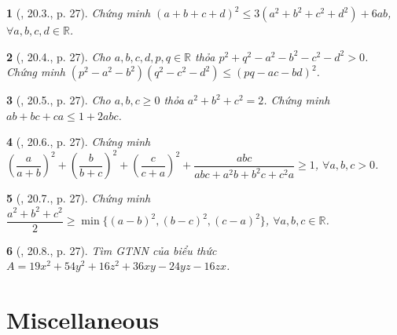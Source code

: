 \documentclass{article}
\newtheorem{baitoan}{}
\begin{document}
\begin{baitoan}[\cite{Hai_Hung_Thu_Tung_ncpt_Toan_10_tap_2}, 20.3., p. 27]
	Chứng minh $(a + b + c + d)^2\le3(a^2 + b^2 + c^2 + d^2) + 6ab$, $\forall a,b,c,d\in\mathbb{R}$.
\end{baitoan}

\begin{baitoan}[\cite{Hai_Hung_Thu_Tung_ncpt_Toan_10_tap_2}, 20.4., p. 27]
	Cho $a,b,c,d,p,q\in\mathbb{R}$ thỏa $p^2 + q^2 - a^2 - b^2 - c^2 - d^2 > 0$. Chứng minh $(p^2 - a^2 - b^2)(q^2 - c^2 - d^2)\le(pq - ac - bd)^2$.
\end{baitoan}

\begin{baitoan}[\cite{Hai_Hung_Thu_Tung_ncpt_Toan_10_tap_2}, 20.5., p. 27]
	Cho $a,b,c\ge0$ thỏa $a^2 + b^2 + c^2 = 2$. Chứng minh $ab + bc + ca\le1 + 2abc$.
\end{baitoan}

\begin{baitoan}[\cite{Hai_Hung_Thu_Tung_ncpt_Toan_10_tap_2}, 20.6., p. 27]
	Chứng minh $\left(\dfrac{a}{a + b}\right)^2 + \left(\dfrac{b}{b + c}\right)^2 + \left(\dfrac{c}{c + a}\right)^2 + \dfrac{abc}{abc + a^2b + b^2c + c^2a}\ge1$, $\forall a,b,c > 0$.
\end{baitoan}

\begin{baitoan}[\cite{Hai_Hung_Thu_Tung_ncpt_Toan_10_tap_2}, 20.7., p. 27]
	Chứng minh $\dfrac{a^2 + b^2 + c^2}{2}\ge\min\{(a - b)^2,(b - c)^2,(c - a)^2\}$, $\forall a,b,c\in\mathbb{R}$.
\end{baitoan}

\begin{baitoan}[\cite{Hai_Hung_Thu_Tung_ncpt_Toan_10_tap_2}, 20.8., p. 27]
	Tìm {\rm GTNN} của biểu thức $A = 19x^2 + 54y^2 + 16z^2 + 36xy - 24yz - 16zx$.
\end{baitoan}


\section{Miscellaneous}


\printbibliography[heading=bibintoc]
	
\end{document}
